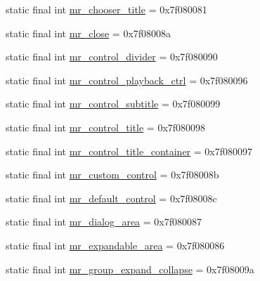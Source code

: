 \begin{CompactItemize}
\item 
static final int \hyperlink{classandroid_1_1support_1_1graphics_1_1drawable_1_1animated_1_1_r_1_1id_4fbdc53b29aec1b3a1dfbb4829b290b1}{mr\_\-chooser\_\-title} = 0x7f080081
\item 
static final int \hyperlink{classandroid_1_1support_1_1graphics_1_1drawable_1_1animated_1_1_r_1_1id_9af40797197112730a134332f80464de}{mr\_\-close} = 0x7f08008a
\item 
static final int \hyperlink{classandroid_1_1support_1_1graphics_1_1drawable_1_1animated_1_1_r_1_1id_6bc96e12c45e51f3b9aaa89e72f2c3db}{mr\_\-control\_\-divider} = 0x7f080090
\item 
static final int \hyperlink{classandroid_1_1support_1_1graphics_1_1drawable_1_1animated_1_1_r_1_1id_eb651f1580ed3986ba60b852721b2966}{mr\_\-control\_\-playback\_\-ctrl} = 0x7f080096
\item 
static final int \hyperlink{classandroid_1_1support_1_1graphics_1_1drawable_1_1animated_1_1_r_1_1id_d9e2f397ca1f4ce96e600337d156ee24}{mr\_\-control\_\-subtitle} = 0x7f080099
\item 
static final int \hyperlink{classandroid_1_1support_1_1graphics_1_1drawable_1_1animated_1_1_r_1_1id_874a73906bc0b0a2abb17e11a150bc90}{mr\_\-control\_\-title} = 0x7f080098
\item 
static final int \hyperlink{classandroid_1_1support_1_1graphics_1_1drawable_1_1animated_1_1_r_1_1id_39a08fb545fc86e2b429f59b2f7589b0}{mr\_\-control\_\-title\_\-container} = 0x7f080097
\item 
static final int \hyperlink{classandroid_1_1support_1_1graphics_1_1drawable_1_1animated_1_1_r_1_1id_93d605f2332fe09433dbcbba4c4ac443}{mr\_\-custom\_\-control} = 0x7f08008b
\item 
static final int \hyperlink{classandroid_1_1support_1_1graphics_1_1drawable_1_1animated_1_1_r_1_1id_3660a3a2b8b0c988df91394faaee3775}{mr\_\-default\_\-control} = 0x7f08008c
\item 
static final int \hyperlink{classandroid_1_1support_1_1graphics_1_1drawable_1_1animated_1_1_r_1_1id_68a9fcc1d11934cc26c761019673b7e3}{mr\_\-dialog\_\-area} = 0x7f080087
\item 
static final int \hyperlink{classandroid_1_1support_1_1graphics_1_1drawable_1_1animated_1_1_r_1_1id_41f44aa06b372e758df6f822bd41390b}{mr\_\-expandable\_\-area} = 0x7f080086
\item 
static final int \hyperlink{classandroid_1_1support_1_1graphics_1_1drawable_1_1animated_1_1_r_1_1id_161b27d9239e536ca30fa0640249295d}{mr\_\-group\_\-expand\_\-collapse} = 0x7f08009a

\end{CompactItemize}
